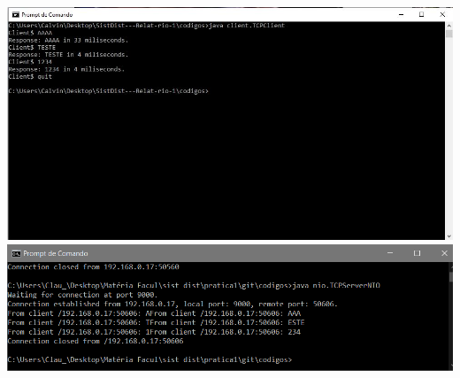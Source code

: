 \vspace{2em}
\begin{minipage}{\textwidth}
    \hspace{-1em}
    \centering
    \includegraphics[trim= 0 200 250 0, clip, scale=.4] {prints/terminal-cilente-nio.JPG}
    \includegraphics[scale=.4]{prints/terminal-server-nio.PNG}
    \label{threadspng}
    \hspace{1em}
\end{minipage}
\vspace{0.5em}

